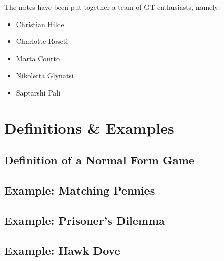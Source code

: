 \documentclass{article}
\begin{document}
The notes have been put together a team of GT enthusiasts, namely:

\begin{itemize}
    \item Christian Hilde
    \item Charlotte Roseti
    \item Marta Courto
    \item Nikoletta Glynatsi
    \item Saptarshi Pali
\end{itemize}

\section{Definitions \& Examples}

\subsection{Definition of a Normal Form Game}





\subsection{Example: Matching Pennies}





\subsection{Example: Prisoner's Dilemma}





\subsection{Example: Hawk Dove}
\end{document}
